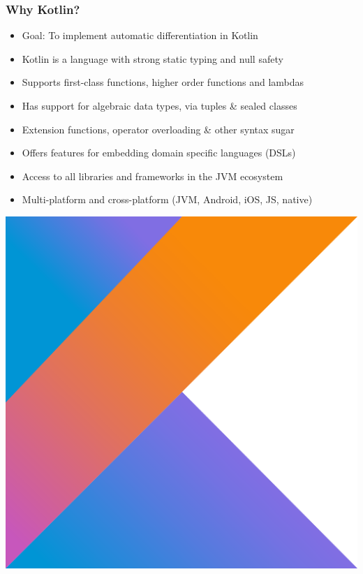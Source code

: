 \documentclass{beamer}
\begin{document}
    \begin{frame}
        \frametitle{Why Kotlin?}
        \begin{itemize}
            \item Goal: To implement automatic differentiation in Kotlin
            \item Kotlin is a language with strong static typing and null safety
            \item Supports first-class functions, higher order functions and lambdas
            \item Has support for algebraic data types, via tuples & sealed classes
            \item Extension functions, operator overloading & other syntax sugar
            \item Offers features for embedding domain specific languages (DSLs)
            \item Access to all libraries and frameworks in the JVM ecosystem
            \item Multi-platform and cross-platform (JVM, Android, iOS, JS, native)
        \end{itemize}
        \begin{center}
            \includegraphics[scale=0.05]{kotlin.png}
        \end{center}
    \end{frame}
\end{document}
